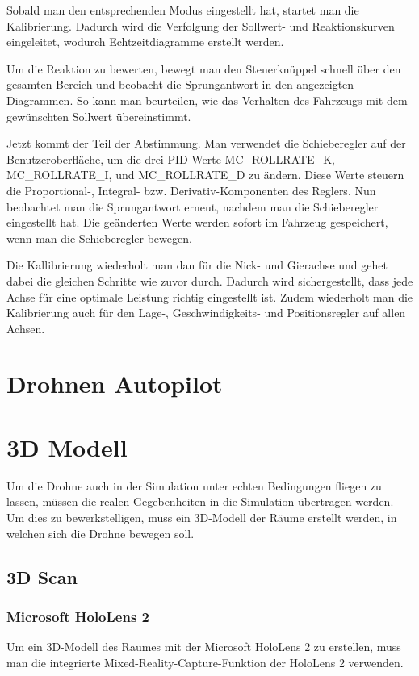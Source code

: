 Sobald man den entsprechenden Modus eingestellt hat, startet man die Kalibrierung. Dadurch wird die Verfolgung der Sollwert- und Reaktionskurven eingeleitet, wodurch Echtzeitdiagramme erstellt werden.

Um die Reaktion zu bewerten, bewegt man den Steuerknüppel schnell über den gesamten Bereich und beobacht die Sprungantwort in den angezeigten Diagrammen. So kann man beurteilen, wie das Verhalten des Fahrzeugs mit dem gewünschten Sollwert übereinstimmt.

Jetzt kommt der Teil der Abstimmung. Man verwendet die Schieberegler auf der Benutzeroberfläche, um die drei PID-Werte MC\_ROLLRATE\_K, MC\_ROLLRATE\_I, und MC\_ROLLRATE\_D zu ändern. Diese Werte steuern die Proportional-, Integral- bzw. Derivativ-Komponenten des Reglers. Nun beobachtet man die Sprungantwort erneut, nachdem man die Schieberegler eingestellt hat. Die geänderten Werte werden sofort im Fahrzeug gespeichert, wenn man die Schieberegler bewegen.

Die Kallibrierung wiederholt man dan für die Nick- und Gierachse und gehet dabei die gleichen Schritte wie zuvor durch. Dadurch wird sichergestellt, dass jede Achse für eine optimale Leistung richtig eingestellt ist. Zudem wiederholt man die Kalibrierung auch für den Lage-, Geschwindigkeits- und Positionsregler auf allen Achsen.



\section{Drohnen Autopilot} \label{drohnen_autopilot:subsection}


\section{3D Modell} \label{3d_modell:section}
Um die Drohne auch in der Simulation unter echten Bedingungen fliegen zu lassen, müssen die realen Gegebenheiten in die Simulation übertragen werden. Um dies zu bewerkstelligen, muss ein 3D-Modell der Räume erstellt werden, in welchen sich die Drohne bewegen soll.
    \subsection{3D Scan} \label{3d-scan:subsection}

        \subsubsection{Microsoft HoloLens 2} \label{hololens:subsubsection}
        Um ein 3D-Modell des Raumes mit der Microsoft HoloLens 2 zu erstellen, muss man die integrierte Mixed-Reality-Capture-Funktion der HoloLens 2 verwenden.
        
